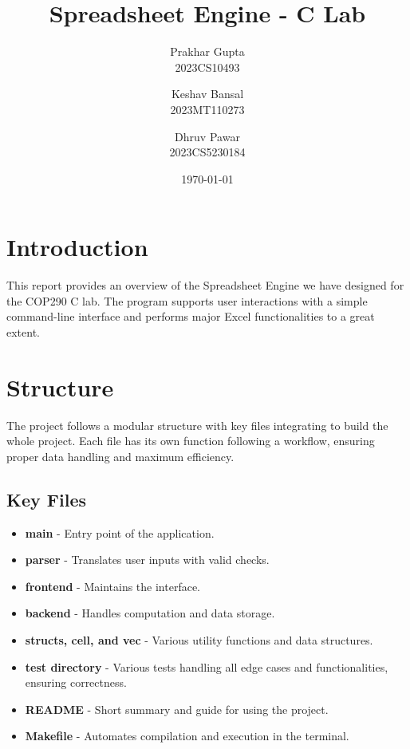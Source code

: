 \documentclass[a4paper,12pt]{article}
\title{Spreadsheet Engine - C Lab}
\author{
    Prakhar Gupta \\ \small 2023CS10493 \and
    Keshav Bansal \\ \small 2023MT110273 \and
    Dhruv Pawar \\ \small 2023CS5230184
}
\date{\today}
\begin{document}
\maketitle

\section{Introduction}
This report provides an overview of the Spreadsheet Engine we have designed for the COP290 C lab. The program supports user interactions with a simple command-line interface and performs major Excel functionalities to a great extent.

\section{Structure}
The project follows a modular structure with key files integrating to build the whole project. Each file has its own function following a workflow, ensuring proper data handling and maximum efficiency. 

\subsection{Key Files}
\begin{itemize}
    \item \textbf{main} - Entry point of the application.
    \item \textbf{parser} - Translates user inputs with valid checks.
    \item \textbf{frontend} - Maintains the interface.
    \item \textbf{backend} - Handles computation and data storage.
    \item \textbf{structs, cell, and vec} - Various utility functions and data structures.
    \item \textbf{test directory} - Various tests handling all edge cases and functionalities, ensuring correctness.
    \item \textbf{README} - Short summary and guide for using the project.
    \item \textbf{Makefile} - Automates compilation and execution in the terminal.
\end{itemize}
\end{document}
